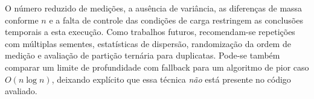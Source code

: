 O número reduzido de medições, a ausência de variância, as diferenças de massa conforme $n$ e a falta de controle das condições de carga restringem as conclusões temporais a esta execução. Como trabalhos futuros, recomendam-se repetições com múltiplas sementes, estatísticas de dispersão, randomização da ordem de medição e avaliação de partição ternária para duplicatas. Pode-se também comparar um limite de profundidade com fallback para um algoritmo de pior caso $O(n\log n)$, deixando explícito que essa técnica \emph{não} está presente no código avaliado.
